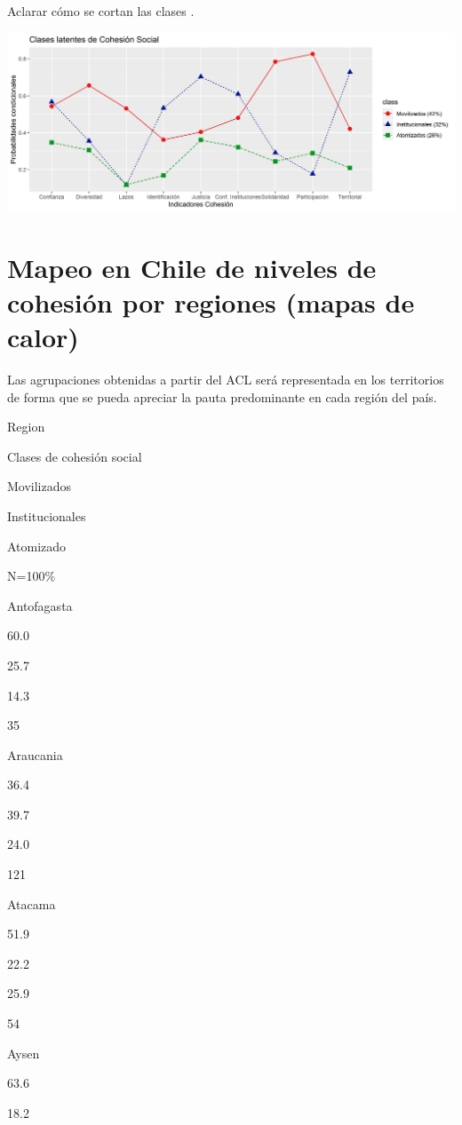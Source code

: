 \documentclass[
  12pt,
]{book}
\begin{document}
Aclarar cómo se cortan las clases .

\begin{center}\includegraphics[width=1\linewidth,height=1\textheight]{output/graphs/lca3} \end{center}

\hypertarget{mapeo-en-chile-de-niveles-de-cohesiuxf3n-por-regiones-mapas-de-calor}{%
\section{Mapeo en Chile de niveles de cohesión por regiones (mapas de calor)}\label{mapeo-en-chile-de-niveles-de-cohesiuxf3n-por-regiones-mapas-de-calor}}

Las agrupaciones obtenidas a partir del ACL será representada en los territorios de forma que se pueda apreciar la pauta predominante en cada región del país.

Region

Clases de cohesión social

Movilizados

Institucionales

Atomizado

N=100\%

Antofagasta

60.0

25.7

14.3

35

Araucania

36.4

39.7

24.0

121

Atacama

51.9

22.2

25.9

54

Aysen

63.6

18.2
\end{document}
